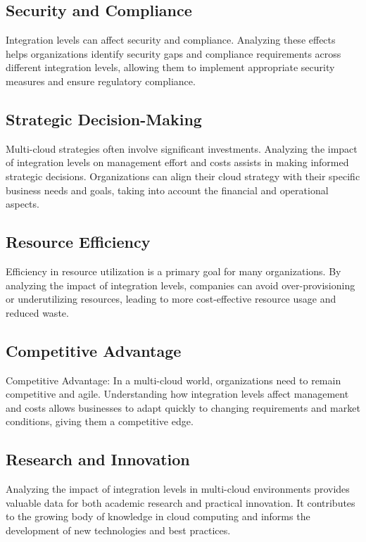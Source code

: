 \subsection*{Security and Compliance}
Integration levels can affect security and compliance. 
Analyzing these effects helps organizations identify security gaps and compliance requirements across different integration levels, 
allowing them to implement appropriate security measures and ensure regulatory compliance.

\subsection*{Strategic Decision-Making}
Multi-cloud strategies often involve significant investments. Analyzing the impact of integration levels on management effort and 
costs assists in making informed strategic decisions. 
Organizations can align their cloud strategy with their specific business needs and goals, taking into account the financial and operational aspects.

\subsection*{Resource Efficiency}
Efficiency in resource utilization is a primary goal for many organizations. 
By analyzing the impact of integration levels, companies can avoid over-provisioning or underutilizing resources, 
leading to more cost-effective resource usage and reduced waste.

\subsection*{Competitive Advantage}
Competitive Advantage: In a multi-cloud world, organizations need to remain competitive and agile. 
Understanding how integration levels affect management and costs allows businesses to adapt quickly to changing requirements and market conditions, 
giving them a competitive edge.

\subsection*{Research and Innovation} 
Analyzing the impact of integration levels in multi-cloud environments provides valuable data for both academic research and practical innovation. 
It contributes to the growing body of knowledge in cloud computing and informs the development of new technologies and best practices.

